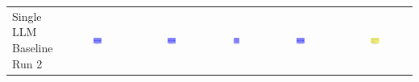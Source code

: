 \begin{table}
\begin{tabular}{@{}lccccc@{}}
    \makecell{Single LLM \\ Baseline \\ Run 2} & \includegraphics[width=0.13\textwidth]{./run_2/png/gpt-4o_results/MicrofluidicChip.png} & \includegraphics[width=0.13\textwidth]{./run_2/png/o1-preview_results/MicrofluidicChip.png} & \includegraphics[width=0.13\textwidth]{./run_2/png/claude-3-5-sonnet-20240620_results/MicrofluidicChip.png} & \includegraphics[width=0.13\textwidth]{./run_2/png/watsonx_meta-llama_llama-3-1-70b-instruct_results/MicrofluidicChip.png} & \includegraphics[width=0.13\textwidth]{./run_2/png/watsonx_meta-llama_llama-3-405b-instruct_results/MicrofluidicChip.png} \\

\end{tabular}
\end{table}
